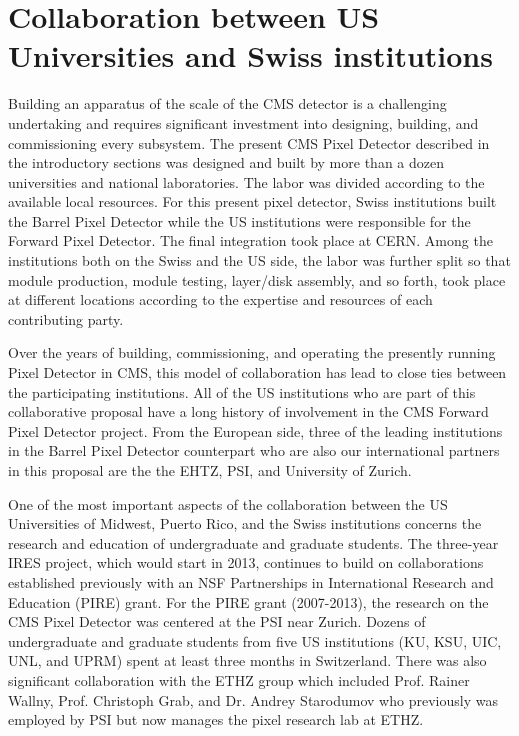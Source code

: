 
\section{Collaboration between US Universities and
Swiss institutions}
\label{sec:ties}


Building an apparatus of the scale of the CMS detector is a
challenging undertaking and requires significant investment into
designing, building, and commissioning every subsystem. The present
CMS Pixel Detector described in the introductory sections was designed
and built by more than a dozen universities and national laboratories.
The labor was divided according to the available local resources.  For
this present pixel detector, Swiss institutions built the Barrel Pixel
Detector while the US institutions were responsible for the Forward
Pixel Detector. The final integration took place at CERN. Among the
institutions both on the Swiss and the US side, the labor was further
split so that module production, module testing, layer/disk assembly,
and so forth, took place at different locations according to the
expertise and resources of each contributing party.

Over the years of building, commissioning, and operating the presently
running Pixel Detector in CMS, this model of collaboration has lead to
close ties between the participating institutions. All of the US
institutions who are part of this collaborative proposal have a long
history of involvement in the CMS Forward Pixel Detector project. From
the European side, three of the leading institutions in the Barrel Pixel
Detector counterpart who are also our international partners in this
proposal are the the EHTZ, PSI, and University of Zurich.

One of the most important aspects of the collaboration between the US
Universities of Midwest, Puerto Rico, and the Swiss institutions
concerns the research and education of undergraduate and graduate
students. The three-year IRES project, which would start in 2013,
continues to build on collaborations established previously with an
NSF Partnerships in International Research and Education (PIRE)
grant. For the PIRE grant (2007-2013), the research on the CMS Pixel
Detector was centered at the PSI near Zurich. Dozens of undergraduate
and graduate students from five US institutions (KU, KSU, UIC, UNL,
and UPRM) spent at least three months in Switzerland.  There was also
significant collaboration with the ETHZ group which included
Prof. Rainer Wallny, Prof. Christoph Grab, and Dr. Andrey Starodumov who
previously was employed by PSI but now manages the pixel research lab
at ETHZ.

